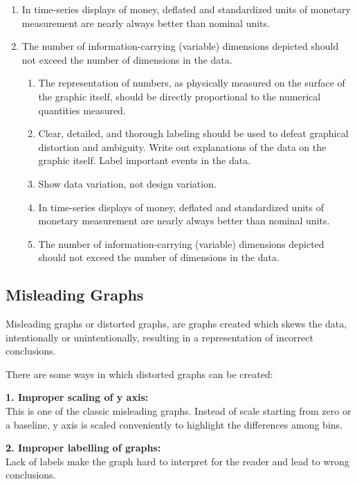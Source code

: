 \documentclass[]{book}
\theoremstyle{definition}
\theoremstyle{definition}
\theoremstyle{definition}
\theoremstyle{remark}
\begin{document}
\begin{enumerate}
\def\labelenumi{\arabic{enumi}.}
\setcounter{enumi}{3}
\item
  In time-series displays of money, deﬂated and standardized units of
  monetary measurement are nearly always better than nominal units.
\item
  The number of information-carrying (variable) dimensions depicted
  should not exceed the number of dimensions in the data.

  \begin{enumerate}
  \def\labelenumii{\arabic{enumii}.}
  \item
    The representation of numbers, as physically measured on the surface
    of the graphic itself, should be directly proportional to the
    numerical quantities measured.
  \item
    Clear, detailed, and thorough labeling should be used to defeat
    graphical distortion and ambiguity. Write out explanations of the
    data on the graphic itself. Label important events in the data.
  \item
    Show data variation, not design variation.
  \item
    In time-series displays of money, deﬂated and standardized units of
    monetary measurement are nearly always better than nominal units.
  \item
    The number of information-carrying (variable) dimensions depicted
    should not exceed the number of dimensions in the data.
  \end{enumerate}
\end{enumerate}

\subsection{Misleading Graphs}\label{misleading-graphs}

Misleading graphs or distorted graphs, are graphs created which skews
the data, intentionally or unintentionally, resulting in a
representation of incorrect conclusions.

There are some ways in which distorted graphs can be created:

\textbf{1. Improper scaling of y axis:}\\
This is one of the classic misleading graphs. Instead of scale starting
from zero or a baseline, y axis is scaled conveniently to highlight the
differences among bins.

\textbf{2. Improper labelling of graphs:}\\
Lack of labels make the graph hard to interpret for the reader and lead
to wrong conclusions.
\end{document}
